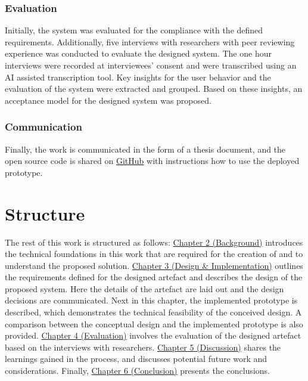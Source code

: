 \subsubsection{Evaluation}

Initially, the system was evaluated for the compliance with the defined requirements. Additionally, five interviews with researchers with peer reviewing experience was conducted to evaluate the designed system. The one hour interviews were recorded at interviewees' consent and were transcribed using an AI assisted transcription tool. Key insights for the user behavior and the evaluation of the system were extracted and grouped. Based on these insights, an acceptance model for the designed system was proposed.


\subsubsection{Communication}

Finally, the work is communicated in the form of a thesis document, and the open source code is shared on \href{https://github.com/kuzdogan/peer-review-verifiable-credentials-thesis}{GitHub} with instructions how to use the deployed prototype. 

\section{Structure}

The rest of this work is structured as follows: \hyperref[chapter:background]{Chapter 2 (Background)} introduces the technical foundations in this work that are required for the creation of and to understand the proposed solution. \hyperref[chapter:design]{Chapter 3 (Design \& Implementation)} outlines the requirements defined for the designed artefact and describes the design of the proposed system. Here the details of the artefact are laid out and the design decisions are communicated. Next in this chapter, the implemented prototype is described, which demonstrates the technical feasibility of the conceived design. A comparison between the conceptual design and the implemented prototype is also provided. \hyperref[chapter:evaluation]{Chapter 4 (Evaluation)} involves the evaluation of the designed artefact based on the interviews with researchers. \hyperref[chapter:discussion]{Chapter 5 (Discussion)} shares the learnings gained in the process, and discusses potential future work and considerations. Finally, \hyperref[chapter:conclusion]{Chapter 6 (Conclusion)} presents the conclusions.